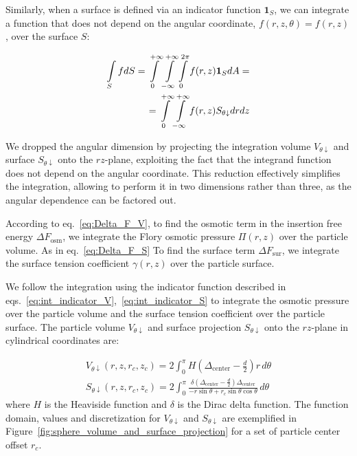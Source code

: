 \documentclass[10pt, a4paper]{article}
\begin{document}
\begin{multicols}{2}
Similarly, when a surface is defined via an indicator function $\bm{1}_S$, we can integrate a function that does not depend on the angular coordinate, $f(r, z, \theta) = f(r, z)$, over the surface $S$:

\begin{eqnarray}
    \label{eq:int_indicator_S}
    \begin{split}
        \int\limits_{S} f dS = \int\displaylimits_{0}^{+\infty} \int\displaylimits_{-\infty}^{+\infty} \int\displaylimits_{0}^{2\pi} f(r, z) \bm{1}_S  dA =\\
        =\int\displaylimits_{0}^{+\infty} \int\displaylimits_{-\infty}^{+\infty} f(r, z)  S_{\theta \downarrow} dr dz
    \end{split}
\end{eqnarray}

We dropped the angular dimension by projecting the integration volume $V_{\theta \downarrow}$ and surface $S_{\theta \downarrow}$ onto the $rz$-plane, exploiting the fact that the integrand function does not depend on the angular coordinate.
This reduction effectively simplifies the integration, allowing to perform it in two dimensions rather than three, as the angular dependence can be factored out.

According to eq.~\ref{eq:Delta_F_V}, to find the osmotic term in the insertion free energy $\Delta F_{\textrm{osm}}$, we integrate the Flory osmotic pressure $\Pi(r, z)$ over the particle volume.
As in eq.~\ref{eq:Delta_F_S} To find the surface term $\Delta F_{\textrm{sur}}$, we integrate the surface tension coefficient $\gamma(r, z)$ over the particle surface.

We follow the integration using the indicator function described in eqs.~\ref{eq:int_indicator_V},~\ref{eq:int_indicator_S} to integrate the osmotic pressure over the particle volume and the surface tension coefficient over the particle surface.
The particle volume $V_{\theta \downarrow}$ and surface projection $S_{\theta \downarrow}$ onto the $rz$-plane in cylindrical coordinates are:

\begin{gather}
    V_{\theta \downarrow}(r, z, r_c, z_c) = 2\int_{0}^{\pi} H\left( \Delta_{\textrm{center}} - \frac{d}{2} \right) r \, d\theta
    \\
    S_{\theta \downarrow}(r, z, r_c, z_c) = 2\int_{0}^{\pi} \frac{\delta \left( \Delta_{\textrm{center}} - \frac{d}{2} \right) \Delta_{\textrm{center}}}{-r \sin \theta + r_c \sin \theta \cos \theta} \, d\theta
\end{gather}
where $H$ is the Heaviside function and $\delta$ is the Dirac delta function.
The function domain, values and discretization for $V_{\theta \downarrow}$ and $S_{\theta \downarrow}$ are exemplified in Figure~\ref{fig:sphere_volume_and_surface_projection} for a set of particle center offset $r_c$.


\end{multicols}
\end{document}
